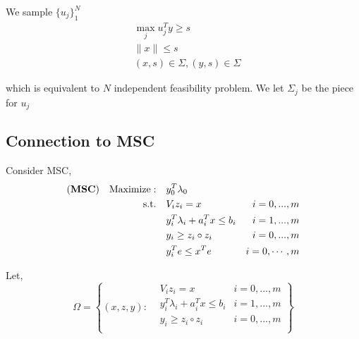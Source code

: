 \documentclass[../main]{subfiles}
\begin{document}
We sample \(\{u_j\}_1^N\)
\begin{align}
     & \max_j u^T_j y \ge s                 \\
     & \|x \| \le s                         \\
     & (x, s) \in \Sigma, (y, s) \in \Sigma
\end{align}

which is equivalent to \(N\) independent feasibility problem. We let \(\Sigma_j\) be the piece for \(u_j\)


\subsection{Connection to MSC}
Consider MSC,
\begin{equation}\label{eq.rel.msc}
    \begin{aligned}
        (\textbf{MSC}) \quad \mathrm{Maximize: }\quad & y_0 ^T\lambda_0                                     \\
        \mathrm{s.t.} \quad                        & V_i z_i = x                        & i=0,...,m      \\
                                                   & y_i ^T\lambda_i  + a_i^Tx  \le b_i & i=1,...,m      \\
                                                   & y_i \ge z_i \circ z_i              & i=0,...,m      \\
                                                   & y_i^Te \le x^Te                    & i=0, \cdots, m
    \end{aligned}
\end{equation}

Let,
\begin{equation}
    \Omega = \left\{ (x,z,y) :  \begin{aligned}
         & V_i z_i = x                        & i=0,...,m \\
         & y_i ^T\lambda_i  + a_i^Tx  \le b_i & i=1,...,m \\
         & y_i \ge z_i \circ z_i              & i=0,...,m \\
    \end{aligned}\right\}
\end{equation}
\end{document}

